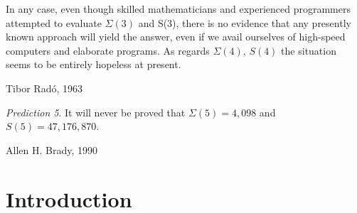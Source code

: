 \documentclass[a4paper,british]{article}
\theoremstyle{definition} %
\numberwithin{equation}{section}
\theoremstyle{definition} %
\newcommand{\BBtheFifth}{47{,}176{,}870}
\newcommand{\SigmaTheFifth}{4{,}098}
\newcommand{\radofull}{Tibor Rad\'o\xspace}
\begin{document}
\date{}

\maketitle

\vspace{-1em}
\begin{abstract}
    The Busy Beaver value $S(n)$ is the maximum~number of steps that an n-state 2-symbol Turing machine can perform from the all-zero tape before halting. $S$ was historically introduced by \radofull in 1962 as one of the simplest examples of an uncomputable function.

    We prove that $S(5) = 47,176,870$ using the Coq proof assistant. The proof enumerates 181,385,789 Turing machines with 5 states and, for each machine, decides whether it halts or not.
    Our result marks the first determination of a new Busy Beaver value in over 40 years and the first Busy Beaver value ever to be formally verified, attesting to the effectiveness of massively collaborative online research (\url{bbchallenge.org}).
\end{abstract}


\setcounter{tocdepth}{2}
\begingroup
\renewcommand{\baselinestretch}{0.85}\normalsize
\tableofcontents
\endgroup

\newpage


\begin{center}

\end{center}
\vspace{-20pt}
\setlength{\epigraphwidth}{0.7\textwidth}
\epigraph{In any case, even though skilled mathematicians and experienced programmers attempted to evaluate $\Sigma(3)$ and S(3), there is no evidence that any presently known approach will yield the answer, even if we avail ourselves of high-speed computers and elaborate programs. As regards $\Sigma(4)$, $S(4)$ the situation seems to be entirely hopeless at present.}{\radofull, 1963 \cite{Rado_1963}}
\vspace{-1em}
\epigraph{\textit{Prediction 5}. It will never be proved that $\Sigma(5) = \SigmaTheFifth$ and $S(5) = \BBtheFifth$.}{Allen H. Brady, 1990 \cite{BradyMeaningOfLife}}
\vspace{2em}



\vspace{-30pt}

\section{Introduction}\label{sec:intro}
\end{document}
